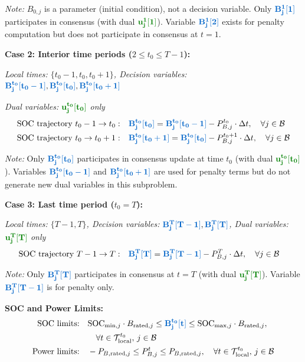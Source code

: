 \documentclass[11pt]{article}
\newcommand{\blueB}[1]{\textcolor{bluevar}{\mathbf{#1}}}      %
\newcommand{\greenu}[1]{\textcolor{greenvar}{\mathbf{#1}}}    %
\begin{document}
\textit{Note:} $B_{0,j}$ is a parameter (initial condition), not a decision variable. Only $\blueB{B_j^{1}[1]}$ participates in consensus (with dual $\greenu{u_j^{1}[1]}$). Variable $\blueB{B_j^{1}[2]}$ exists for penalty computation but does not participate in consensus at $t=1$.

\noindent\textbf{Case 2: Interior time periods ($2 \leq t_0 \leq T-1$):}

\textit{Local times: $\{t_0-1, t_0, t_0+1\}$, Decision variables: $\blueB{B_j^{t_0}[t_0-1]}, \blueB{B_j^{t_0}[t_0]}, \blueB{B_j^{t_0}[t_0+1]}$}

\textit{Dual variables: $\greenu{u_j^{t_0}[t_0]}$ only}
\begin{align}
\text{SOC trajectory } t_0-1 \to t_0: \quad & \blueB{B_j^{t_0}[t_0]} = \blueB{B_j^{t_0}[t_0-1]} - P_{B,j}^{t_0} \cdot \Delta t, \quad \forall j \in \mathcal{B} \\
\text{SOC trajectory } t_0 \to t_0+1: \quad & \blueB{B_j^{t_0}[t_0+1]} = \blueB{B_j^{t_0}[t_0]} - P_{B,j}^{t_0+1} \cdot \Delta t, \quad \forall j \in \mathcal{B}
\end{align}

\textit{Note:} Only $\blueB{B_j^{t_0}[t_0]}$ participates in consensus update at time $t_0$ (with dual $\greenu{u_j^{t_0}[t_0]}$). Variables $\blueB{B_j^{t_0}[t_0-1]}$ and $\blueB{B_j^{t_0}[t_0+1]}$ are used for penalty terms but do not generate new dual variables in this subproblem.

\noindent\textbf{Case 3: Last time period ($t_0 = T$):}

\textit{Local times: $\{T-1, T\}$, Decision variables: $\blueB{B_j^{T}[T-1]}, \blueB{B_j^{T}[T]}$, Dual variables: $\greenu{u_j^{T}[T]}$ only}
\begin{align}
\text{SOC trajectory } T-1 \to T: \quad & \blueB{B_j^{T}[T]} = \blueB{B_j^{T}[T-1]} - P_{B,j}^T \cdot \Delta t, \quad \forall j \in \mathcal{B}
\end{align}

\textit{Note:} Only $\blueB{B_j^{T}[T]}$ participates in consensus at $t=T$ (with dual $\greenu{u_j^{T}[T]}$). Variable $\blueB{B_j^{T}[T-1]}$ is for penalty only.

\textbf{SOC and Power Limits:}
\begin{align}
\text{SOC limits:} \quad & \text{SOC}_{\min,j} \cdot B_{\text{rated},j} \leq \blueB{B_j^{t_0}[t]} \leq \text{SOC}_{\max,j} \cdot B_{\text{rated},j}, \notag \\
& \quad \forall t \in \mathcal{T}_{\text{local}}^{t_0}, \, j \in \mathcal{B} \\
\text{Power limits:} \quad & -P_{B,\text{rated},j} \leq P_{B,j}^{t} \leq P_{B,\text{rated},j}, \quad \forall t \in \mathcal{T}_{\text{local}}^{t_0}, \, j \in \mathcal{B}
\end{align}
\end{document}

